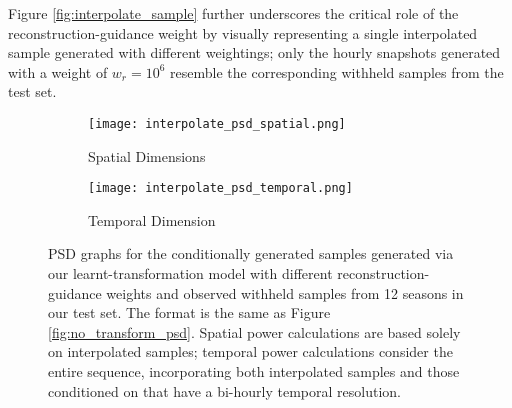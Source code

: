 \documentclass[ oneside,%
                    author={George Herbert},
                    degree={MSci},
                     title={Diffusion Models for Time-Evolving Precipitation Fields},
                  subtitle={}]{dissertation}
\begin{document}
Figure \ref{fig:interpolate_sample} further underscores the critical role of the reconstruction-guidance weight by visually representing a single interpolated sample generated with different weightings; only the hourly snapshots generated with a weight of $w_r=10^6$ resemble the corresponding withheld samples from the test set.

\begin{figure}[htbp]
      \centering
      \begin{subfigure}{.49\textwidth}
            \texttt{[image: interpolate\_psd\_spatial.png]}
            \caption{Spatial Dimensions}
            \label{fig:interpolate_psd_spatial}
      \end{subfigure}
      \begin{subfigure}{.49\textwidth}
            \texttt{[image: interpolate\_psd\_temporal.png]}
            \caption{Temporal Dimension}
            \label{fig:interpolate_psd_temporal}
      \end{subfigure}
      \caption{PSD graphs for the conditionally generated samples generated via our learnt-transformation model with different reconstruction-guidance weights and observed withheld samples from 12 seasons in our test set. The format is the same as Figure \ref{fig:no_transform_psd}. Spatial power calculations are based solely on interpolated samples; temporal power calculations consider the entire sequence, incorporating both interpolated samples and those conditioned on that have a bi-hourly temporal resolution.}
      \label{fig:interpolate_psd}
\end{figure}
\end{document}
